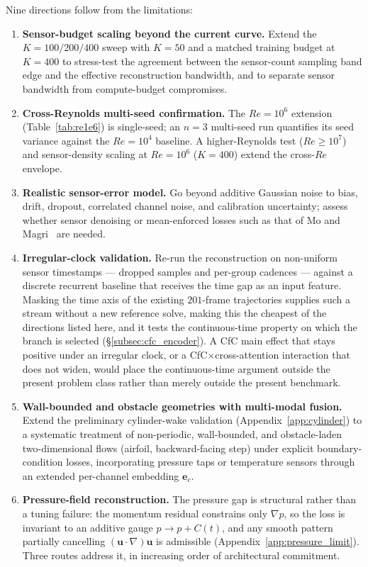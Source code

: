 Nine directions follow from the limitations:
\begin{enumerate}
    \item \textbf{Sensor-budget scaling beyond the current curve.} Extend the $K=100/200/400$ sweep with $K=50$ and a matched training budget at $K=400$ to stress-test the agreement between the sensor-count sampling band edge and the effective reconstruction bandwidth, and to separate sensor bandwidth from compute-budget compromises.
    \item \textbf{Cross-Reynolds multi-seed confirmation.} The $Re=10^6$ extension (Table~\ref{tab:re1e6}) is single-seed; an $n=3$ multi-seed run quantifies its seed variance against the $Re=10^4$ baseline. A higher-Reynolds test ($Re \ge 10^7$) and sensor-density scaling at $Re=10^6$ ($K=400$) extend the cross-$Re$ envelope.
    \item \textbf{Realistic sensor-error model.} Go beyond additive Gaussian noise to bias, drift, dropout, correlated channel noise, and calibration uncertainty; assess whether sensor denoising or mean-enforced losses such as that of Mo and Magri~\cite{Mo2025PRF} are needed.
    \item \textbf{Irregular-clock validation.} Re-run the reconstruction on non-uniform sensor timestamps --- dropped samples and per-group cadences --- against a discrete recurrent baseline that receives the time gap as an input feature. Masking the time axis of the existing $201$-frame trajectories supplies such a stream without a new reference solve, making this the cheapest of the directions listed here, and it tests the continuous-time property on which the branch is selected (\S\ref{subsec:cfc_encoder}). A CfC main effect that stays positive under an irregular clock, or a CfC$\times$cross-attention interaction that does not widen, would place the continuous-time argument outside the present problem class rather than merely outside the present benchmark.
    \item \textbf{Wall-bounded and obstacle geometries with multi-modal fusion.} Extend the preliminary cylinder-wake validation (Appendix~\ref{app:cylinder}) to a systematic treatment of non-periodic, wall-bounded, and obstacle-laden two-dimensional flows (airfoil, backward-facing step) under explicit boundary-condition losses, incorporating pressure taps or temperature sensors through an extended per-channel embedding $\mathbf{e}_c$.
    \item \textbf{Pressure-field reconstruction.} The pressure gap is structural rather than a tuning failure: the momentum residual constrains only $\nabla p$, so the loss is invariant to an additive gauge $p\to p+C(t)$, and any smooth pattern partially cancelling $(\mathbf{u}\cdot\nabla)\mathbf{u}$ is admissible (Appendix~\ref{app:pressure_limit}). Three routes address it, in increasing order of architectural commitment.


\end{enumerate}
